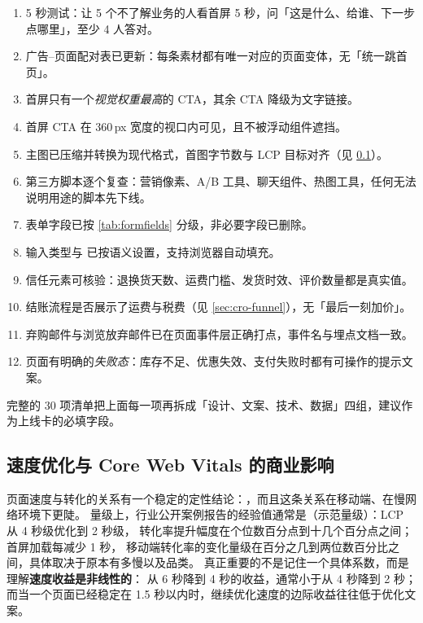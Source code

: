 \begin{toolbox}
\begin{enumerate}
  \item 5 秒测试：让 5 个不了解业务的人看首屏 5 秒，问「这是什么、给谁、下一步点哪里」，至少 4 人答对。
  \item 广告--页面配对表已更新：每条素材都有唯一对应的页面变体，无「统一跳首页」。
  \item 首屏只有一个\emph{视觉权重最高}的 CTA，其余 CTA 降级为文字链接。
  \item 首屏 CTA 在 360\,px 宽度的视口内可见，且不被浮动组件遮挡。
  \item 主图已压缩并转换为现代格式，首图字节数与 LCP 目标对齐（见 \cref{sec:cro-speed}）。
  \item 第三方脚本逐个复查：营销像素、A/B 工具、聊天组件、热图工具，任何无法说明用途的脚本先下线。
  \item 表单字段已按 \cref{tab:formfields} 分级，非必要字段已删除。
  \item 输入类型与  已按语义设置，支持浏览器自动填充。
  \item 信任元素可核验：退换货天数、运费门槛、发货时效、评价数量都是真实值。
  \item 结账流程是否展示了运费与税费（见 \cref{sec:cro-funnel}），无「最后一刻加价」。
  \item 弃购邮件与浏览放弃邮件已在页面事件层正确打点，事件名与埋点文档一致。
  \item 页面有明确的\emph{失败态}：库存不足、优惠失效、支付失败时都有可操作的提示文案。
\end{enumerate}
完整的 30 项清单把上面每一项再拆成「设计、文案、技术、数据」四组，建议作为上线卡的必填字段。
\end{toolbox}

\subsection{速度优化与 Core Web Vitals 的商业影响}
\label{sec:cro-speed}

页面速度与转化的关系有一个稳定的定性结论：，而且这条关系在移动端、在慢网络环境下更陡。
量级上，行业公开案例报告的经验值通常是（示范量级）：LCP 从 4 秒级优化到 2 秒级，
转化率提升幅度在个位数百分点到十几个百分点之间；首屏加载每减少 1 秒，
移动端转化率的变化量级在百分之几到两位数百分比之间，具体取决于原本有多慢以及品类。
真正重要的不是记住一个具体系数，而是理解\textbf{速度收益是非线性的}：
从 6 秒降到 4 秒的收益，通常小于从 4 秒降到 2 秒；
而当一个页面已经稳定在 1.5 秒以内时，继续优化速度的边际收益往往低于优化文案。

